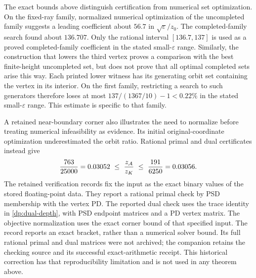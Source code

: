 The exact bounds above distinguish certification from numerical set
optimization. On the fixed-ray family, normalized numerical optimization of
the uncompleted family suggests a leading coefficient about $56.7$ in
$\sqrt\varepsilon/z_0$. The completed-family search found about $136.707$.
Only the rational interval $[136.7,137]$ is used as a proved completed-family
coefficient in the stated small-$\varepsilon$ range. Similarly, the
construction that lowers the third vertex proves a comparison with the best
finite-height uncompleted set, but does not prove that all optimal completed
sets arise this way.
Each printed lower witness has its generating orbit set containing the
vertex in its interior. On the first family, restricting a search to such
generators therefore loses at most $137/(1367/10)-1<0.22\%$ in the stated
small-$\varepsilon$ range. This estimate is specific to that family.

A retained near-boundary corner also illustrates the need to normalize
before treating numerical infeasibility as evidence. Its initial
original-coordinate optimization underestimated the orbit ratio. Rational
primal and dual certificates instead give
\[
 \frac{763}{25000}=0.03052\ \le\ \frac{\zA}{\zK}\ \le\
 \frac{191}{6250}=0.03056.
\]
The retained verification records fix the input as the exact binary values
of the stored floating-point data. They report a rational primal check by
PSD membership with the vertex PD. The reported dual check uses
the trace identity in \cref{dp:dual-depth}, with PSD endpoint matrices and
a PD vertex matrix. The objective normalization uses the exact corner
bound of that specified input. The record reports an exact bracket, rather
than a numerical solver bound. Its full rational primal and dual matrices
were not archived; the companion retains the checking source and its
successful exact-arithmetic receipt. This historical correction has that
reproducibility limitation and is not used in any theorem above.
